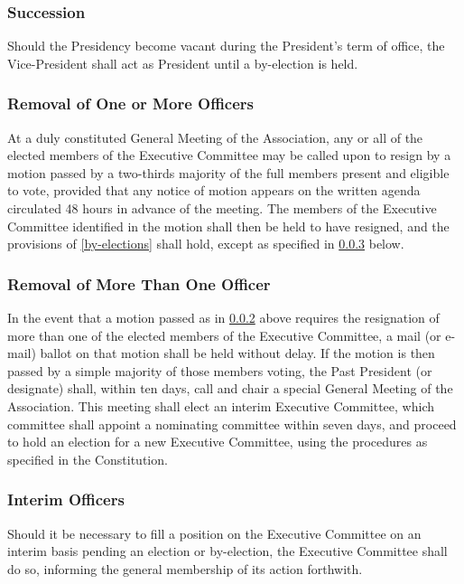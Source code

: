 \documentclass[12pt]{article}
\begin{document}
\subsubsection{Succession}
Should the Presidency become vacant during the President's term of office, the Vice-President shall act as President until a by-election is held.

\subsubsection{Removal of One or More Officers}
\label{remove-one}
At a duly constituted General Meeting of the Association, any or all of the elected members of the Executive Committee may be called upon to resign by a motion passed by a two-thirds majority of the full members present and eligible to vote, provided that any notice of motion appears on the written agenda circulated 48 hours in advance of the meeting. The members of the Executive Committee identified in the motion shall then be held to have resigned, and the provisions of \ref{by-elections} shall hold, except as specified in \ref{remove-more} below.

\subsubsection{Removal of More Than One Officer}
\label{remove-more}

In the event that a motion passed as in \ref{remove-one} above requires the resignation of more than one of the elected members of the Executive Committee, a mail (or e-mail) ballot on that motion shall be held without delay. If the motion is then passed by a simple majority of those members voting, the Past President (or designate) shall, within ten days, call and chair a special General Meeting of the Association. This meeting shall elect an interim Executive Committee, which committee shall appoint a nominating committee within seven days, and proceed to hold an election for a new Executive Committee, using the procedures as specified in the Constitution.

\subsubsection{Interim Officers}
Should it be necessary to fill a position on the Executive Committee on an interim basis pending an election or by-election, the Executive Committee shall do so, informing the general membership of its action forthwith.
\end{document}
